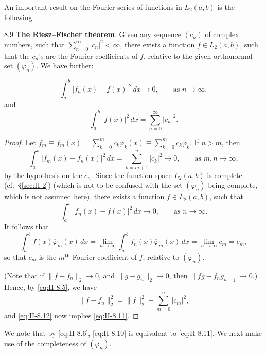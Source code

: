 An important result on the Fourier series of functions in $L_{2}(a,b)$ is the following

\begin{nstmt}{8.9}\label{eq:II-8.9}
\textbf{The Riesz--Fischer theorem}. Given any sequence $(c_{n})$ of complex numbers, such that $\sum_{n=0}^{\infty}|c_{n}|^{2}<\infty$, there exists a function $f\in L_{2}(a,b)$, such that the $c_{n}$'s are the Fourier coefficients of $f$, relative to the given orthonormal set $(\varphi_{n})$. We have further:
\end{nstmt}
\begin{equation}\tag{8.10}\label{eq:II-8.10}
\int_{a}^{b}|f_{n}(x)-f(x)|^{2}\,dx\to 0,\qquad\text{as }n\to\infty,
\end{equation}
and
\begin{equation}\tag{8.11}\label{eq:II-8.11}
\int_{a}^{b}|f(x)|^{2}\,dx=\sum_{n=0}^{\infty}|c_{n}|^{2}.
\end{equation}
\begin{proof}
Let $f_{m}\equiv f_{m}(x)=\sum_{k=0}^{m}c_{k}\varphi_{k}(x)\equiv\sum_{k=0}^{m}c_{k}\varphi_{k}$. If $n>m$, then
\[
\int_{a}^{b}|f_{m}(x)-f_{n}(x)|^{2}\,dx=\sum_{k=m+1}^{n}|c_{k}|^{2}\to 0,\qquad\text{as }m,n\to\infty,
\]
by the hypothesis on the $c_{n}$. Since the function space $L_{2}(a,b)$ is complete (cf.\ \S\ref{sec:II-2}) (which is not to be confused with the set $(\varphi_{n})$ being complete, which is not assumed here), there exists a function $f\in L_{2}(a,b)$, such that
\begin{equation}\tag{8.12}\label{eq:II-8.12}
\int_{a}^{b}|f_{n}(x)-f(x)|^{2}\,dx\to 0,\qquad\text{as }n\to\infty.
\end{equation}
It follows that
\[
\int_{a}^{b}f(x)\overline{\varphi}_{m}(x)\,dx
=\lim_{n\to\infty}\int_{a}^{b}f_{n}(x)\overline{\varphi}_{m}(x)\,dx
=\lim_{n\to\infty}c_{m}=c_{m},
\]
so that $c_{m}$ is the $m^{\text{th}}$ Fourier coefficient of $f$, relative to $(\varphi_{n})$.

(Note that if $\|f-f_{n}\|_{2}\to 0$, and $\|g-g_{n}\|_{2}\to 0$, then $\|fg-f_{n}g_{n}\|_{1}\to 0$.) Hence, by \eqref{eq:II-8.5}, we have
\[
\|f-f_{n}\|_{2}^{2}=\|f\|_{2}^{2}-\sum_{m=0}^{n}|c_{m}|^{2},
\]
and \eqref{eq:II-8.12} now implies \eqref{eq:II-8.11}.
\end{proof}

\begin{remark}
We note that by \eqref{eq:II-8.6}, \eqref{eq:II-8.10} is equivalent to \eqref{eq:II-8.11}. We next make use of the completeness of $(\varphi_{n})$.
\end{remark}

